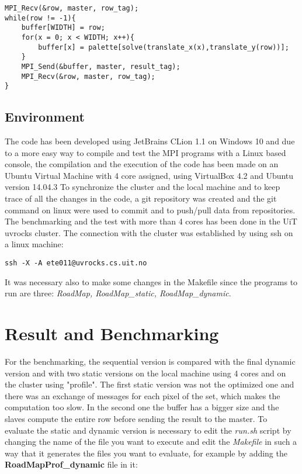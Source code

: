 \documentclass[11pt,conference]{IEEEtran}
\begin{document}
\begin{lstlisting}
MPI_Recv(&row, master, row_tag);
while(row != -1){
	buffer[WIDTH] = row;
	for(x = 0; x < WIDTH; x++){
		buffer[x] = palette[solve(translate_x(x),translate_y(row))];
	}
	MPI_Send(&buffer, master, result_tag);
	MPI_Recv(&row, master, row_tag);
}
\end{lstlisting}


\subsection{Environment}
The code has been developed using JetBrains CLion 1.1 on Windows 10 and due to a more easy way to compile and test the MPI programs with a Linux based console, the compilation and the execution of the code has been made on an Ubuntu Virtual Machine with 4 core assigned, using VirtualBox 4.2 and Ubuntu version 14.04.3
\newline
To synchronize the cluster and the local machine and to keep trace of all the changes in the code, a git repository was created and the git command on linux were used to commit and to push/pull data from repositories.
\newline
The benchmarking and the test with more than 4 cores has been done in the UiT uvrocks cluster. The connection with the cluster was established by using ssh on a linux machine:
\begin{lstlisting}
ssh -X -A ete011@uvrocks.cs.uit.no
\end{lstlisting}

It was necessary also to make some changes in the Makefile since the programs to run are three: \textit{RoadMap, RoadMap\_static, RoadMap\_dynamic}.

\section{Result and Benchmarking}
For the benchmarking, the sequential version is compared with the final dynamic version and with two static versions on the local machine using 4 cores and on the cluster using "profile".
The first static version was not the optimized one and there was an exchange of messages for each pixel of the set, which makes the computation too slow.
In the second one the buffer has a bigger size and the slaves compute the entire row before sending the result to the master.
\newline
To evaluate the static and dynamic version is necessary to edit the \textit{run.sh} script by changing the name of the file you want to execute and edit the \textit{Makefile} in such a way that it generates the files you want to evaluate, for example by adding the \textbf{RoadMapProf\_dynamic} file in it:
\end{document}

